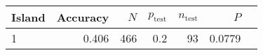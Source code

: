 
\begin{tabular}{lrrrrrl}
\toprule
Island & Accuracy & $N$ & $p_{\mbox{test}}$ & $n_{\mbox{test}}$ & $P$ & \\
\midrule
1 & 0.406 & 466 & 0.2 & 93 & 0.0779 & \\
\bottomrule
\end{tabular}
